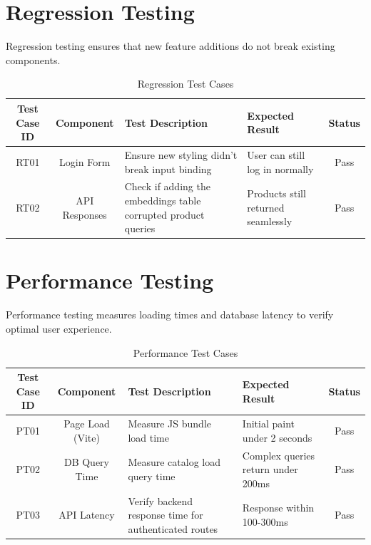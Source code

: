 \newpage
\section{Regression Testing}
Regression testing ensures that new feature additions do not break existing components.
\begin{table}[H]
    \centering
    \renewcommand{\arraystretch}{1.3}
    \small
    \begin{tabular}{|c|c|p{3cm}|p{3cm}|c|}
        \hline
        \textbf{Test Case ID} & \textbf{Component} & \textbf{Test Description} & \textbf{Expected Result} & \textbf{Status} \\
        \hline
        RT01 & Login Form & \raggedright Ensure new styling didn't break input binding & \raggedright User can still log in normally & Pass \\
        \hline
        RT02 & API Responses & \raggedright Check if adding the embeddings table corrupted product queries & \raggedright Products still returned seamlessly & Pass \\
        \hline
    \end{tabular}
    \caption{Regression Test Cases}
    \label{tab:regression_tests}
\end{table}

\newpage
\section{Performance Testing}
Performance testing measures loading times and database latency to verify optimal user experience.
\begin{table}[H]
    \centering
    \renewcommand{\arraystretch}{1.3}
    \begin{tabular}{|c|c|p{4cm}|p{3cm}|c|}
        \hline
        \textbf{Test Case ID} & \textbf{Component} & \textbf{Test Description} & \textbf{Expected Result} & \textbf{Status} \\
        \hline
        PT01 & Page Load (Vite) & Measure JS bundle load time & Initial paint under 2 seconds & Pass \\
        \hline
        PT02 & DB Query Time & Measure catalog load query time & Complex queries return under 200ms & Pass \\
        \hline
        PT03 & API Latency & Verify backend response time for authenticated routes & Response within 100-300ms & Pass \\
        \hline
    \end{tabular}
    \caption{Performance Test Cases}
    \label{tab:performance_tests}
\end{table}
